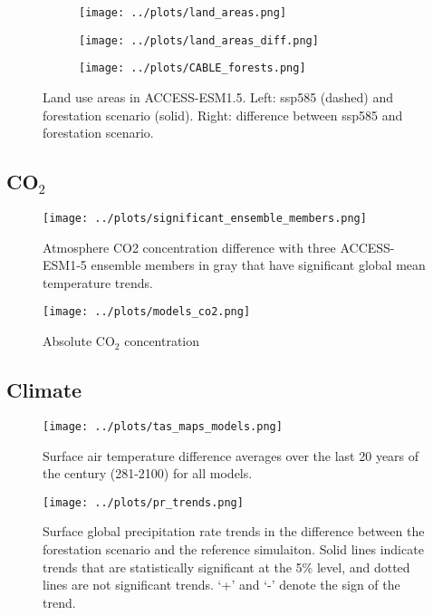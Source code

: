 \documentclass[]{article}
\begin{document}
\begin{figure}[H]
    \centering
    \begin{subfigure}[b]{0.45\linewidth}
        \texttt{[image: ../plots/land\_areas.png]}
    \end{subfigure}
    \begin{subfigure}[b]{0.45\linewidth}
        \texttt{[image: ../plots/land\_areas\_diff.png]}
    \end{subfigure}
    \begin{subfigure}[b]{0.45\linewidth}
        \texttt{[image: ../plots/CABLE\_forests.png]}
    \end{subfigure}
    \caption{Land use areas in ACCESS-ESM1.5. Left: ssp585 (dashed) and forestation scenario (solid). Right: difference between ssp585 and forestation scenario.}
    \label{fig:ACCESS_land_use}
\end{figure}

\subsection{CO$_2$}

\begin{figure}[H]
    \centering
    \texttt{[image: ../plots/significant\_ensemble\_members.png]}
    \caption{Atmosphere CO2 concentration difference with three ACCESS-ESM1-5 ensemble members in gray that have significant global mean temperature trends.}
    \label{fig:models_co2_access_members}
\end{figure}


\begin{figure}[H]
    \centering
    \texttt{[image: ../plots/models\_co2.png]}
    \caption{Absolute CO$_2$ concentration}
    \label{fig:models_co2_absolute}
\end{figure}

\subsection{Climate}

\begin{figure}[H]
    \centering
    \texttt{[image: ../plots/tas\_maps\_models.png]}
    \caption{Surface air temperature difference averages over the last 20 years of the century (281-2100) for all models.}
    \label{fig:models_tas_maps}
\end{figure}

\begin{figure}[H]
    \centering
    \texttt{[image: ../plots/pr\_trends.png]}
    \caption{Surface global precipitation rate trends in the difference between the forestation scenario and the reference simulaiton. Solid lines indicate trends that are statistically significant at the 5\% level, and dotted lines are not significant trends. `+' and `-' denote the sign of the trend.}
    \label{fig:models_pr_trends}
\end{figure}
\end{document}
